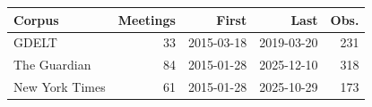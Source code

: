\begin{tabular}{lrrrr}
\toprule
Corpus & Meetings & First & Last & Obs. \\
\midrule
GDELT & 33 & 2015-03-18 & 2019-03-20 & 231 \\
The Guardian & 84 & 2015-01-28 & 2025-12-10 & 318 \\
New York Times & 61 & 2015-01-28 & 2025-10-29 & 173 \\
\bottomrule
\end{tabular}